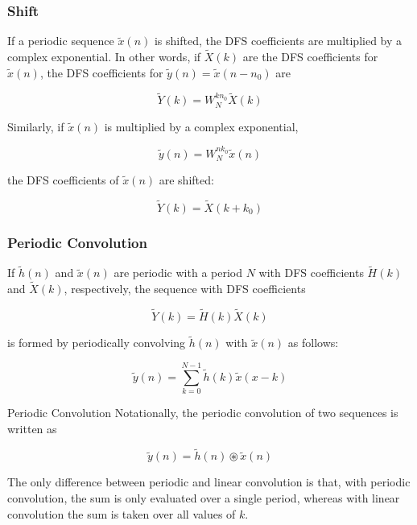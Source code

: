 \documentclass[pdflatex,compress,mathserif]{beamer}
\begin{document}
\begin{frame}
	\frametitle{Shift}
	If a periodic sequence $\tilde{x}(n)$ is shifted, the DFS coefficients are multiplied by a complex exponential. In other words, if $\tilde{X}(k)$ are the DFS coefficients for $ \tilde{x}(n) $, the DFS coefficients for $ \tilde{y}(n) = \tilde{x}(n - n_0) $ are
	
	\begin{equation*}
		\tilde{Y}(k) = W_N^{kn_0}\tilde{X}(k)
	\end{equation*}

	Similarly, if $\tilde{x}(n)$ is multiplied by a complex exponential,
	
	\begin{equation*}
		\tilde{y}(n) = W_N^{nk_0}\tilde{x}(n)
	\end{equation*}

	the DFS coefficients of $ \tilde{x}(n) $ are shifted:
	
	\begin{equation*}
		\tilde{Y}(k) = \tilde{X}(k + k_0)
	\end{equation*}
\end{frame}

\begin{frame}
	\frametitle{Periodic Convolution}
	If $ \tilde{h}(n) $ and $ \tilde{x}(n) $ are periodic with a period $ N $ with DFS coefficients $ \tilde{H}(k) $ and $ \tilde{X}(k) $, respectively, the sequence
	with DFS coefficients
	
	\begin{equation*}
		\tilde{Y}(k) = \tilde{H}(k)\tilde{X}(k)
	\end{equation*}

	is formed by periodically convolving $\tilde{h}(n)$ with $ \tilde{x}(n) $ as follows:
	
	\begin{equation}
		\tilde{y}(n) = \sum\limits_{k=0}^{N-1} \tilde{h}(k)\tilde{x}(x-k)
	\end{equation}
\end{frame}

\begin{frame}{Periodic Convolution}
	Notationally, the periodic convolution of two sequences is written as
	
	\begin{equation*}
		\tilde{y}(n) = \tilde{h}(n)\circledast\tilde{x}(n)
	\end{equation*}
	
	The only difference between periodic and linear convolution is that, with periodic convolution, the sum is only evaluated over a single period, whereas with linear convolution the sum is taken over all values of $ k $.
\end{frame}
\end{document}
